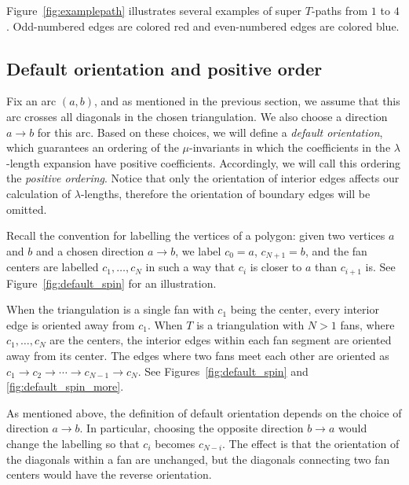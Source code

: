 \documentclass[pdftex]{sigma}
\numberwithin{equation}{section}
\begin{document}
\begin{Example} \label{example:14some}\rm
 Figure~\ref{fig:examplepath} illustrates several examples of super $T$-paths from $1$ to $4$.
 Odd-numbered edges are colored red and even-numbered edges are colored blue.


\end{Example}

\subsection{Default orientation and positive order}	

{Fix an arc $(a,b)$, and as mentioned in the previous section, we assume that this arc crosses all diagonals in the chosen triangulation.
We also choose a direction $a \to b$ for this arc.}
Based on these choices, we will define a \emph{default orientation}, which guarantees an ordering of the $\mu$-invariants
in which the coefficients in the $\lambda$-length expansion have positive coefficients.
Accordingly, we will call this ordering the \emph{positive ordering}.
Notice that only the orientation of interior edges affects our calculation of $\lambda$-lengths, therefore the orientation of boundary edges will be omitted.

Recall the convention for labelling the vertices of a polygon: given two vertices $a$ and $b$ and a chosen
direction $a \to b$, we label $c_0 = a$, $c_{N+1} = b$, and the fan centers are labelled $c_1,\dots,c_N$ in such a way that $c_i$
is closer to $a$ than $c_{i+1}$ is. See Figure~\ref{fig:default_spin} for an illustration.

\begin{Definition}\rm
 When the triangulation is a single fan with $c_1$ being the center, every interior edge is oriented away from $c_1$.
 When $T$ is a triangulation with $N>1$ fans, where $c_1,\dots,c_N$ are the centers, the interior edges within each fan segment are oriented away
 from its center. The edges where two fans meet each other are oriented as
 \( c_1\rightarrow c_2\rightarrow\cdots\rightarrow c_{N-1}\rightarrow c_N \).
 See Figures~\ref{fig:default_spin} and \ref{fig:default_spin_more}.
\end{Definition}




\begin{Remark}\rm
 As mentioned above, the definition of default orientation depends on the choice of direction $a \to b$.
 In particular, choosing the opposite direction $b \to a$ would change the labelling so that $c_i$ becomes $c_{N-i}$.
 The effect is that the orientation of the diagonals within a fan are unchanged, but the diagonals connecting
 two fan centers would have the reverse orientation.
\end{Remark}
\end{document}
